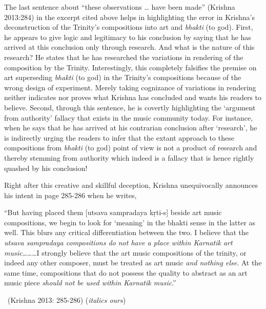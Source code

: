The last sentence about “these observations … have been made” (Krishna 2013:284) in the excerpt cited above helps in highlighting the error in Krishna’s deconstruction of the Trinity’s compositions into art and \textit{bhakti} (to god). First, he appears to give logic and legitimacy to his conclusion by saying that he has arrived at this conclusion only through research. And what is the nature of this research? He states that he has researched the variations in rendering of the composition by the Trinity. Interestingly, this completely falsifies the premise on art superseding \textit{bhakti} (to god) in the Trinity’s compositions because of the wrong design of experiment. Merely taking cognizance of variations in rendering neither indicates nor proves what Krishna has concluded and wants his readers to believe. Second, through this sentence, he is covertly highlighting the ‘argument from authority’ fallacy that exists in the music community today. For instance, when he says that he has arrived at his contrarian conclusion after ‘research’, he is indirectly urging the readers to infer that the extant approach to these compositions from \textit{bhakti} (to god) point of view is not a product of research and thereby stemming from authority which indeed is a fallacy that is hence rightly quashed by his conclusion!

Right after this creative and skillful deception, Krishna unequivocally announces his intent in page 285-286 when he writes,

\begin{myquote}
“But having placed them [utsava sampradaya kṛti-s] beside art music compositions, we begin to look for ‘meaning’ in the bhakti sense in the latter as well. This blurs any critical differentiation between the two. I believe that the \textit{utsava sampradaya compositions do not have a place within Karnatik art music}………I strongly believe that the art music compositions of the trinity, or indeed any other composer, must be treated as art music \textit{and nothing else}. At the same time, compositions that do not possess the quality to abstract as an art music piece \textit{should not be used within Karnatik music}.” 

~\hfill (Krishna 2013: 285-286) (\textit{italics ours})
\end{myquote}

